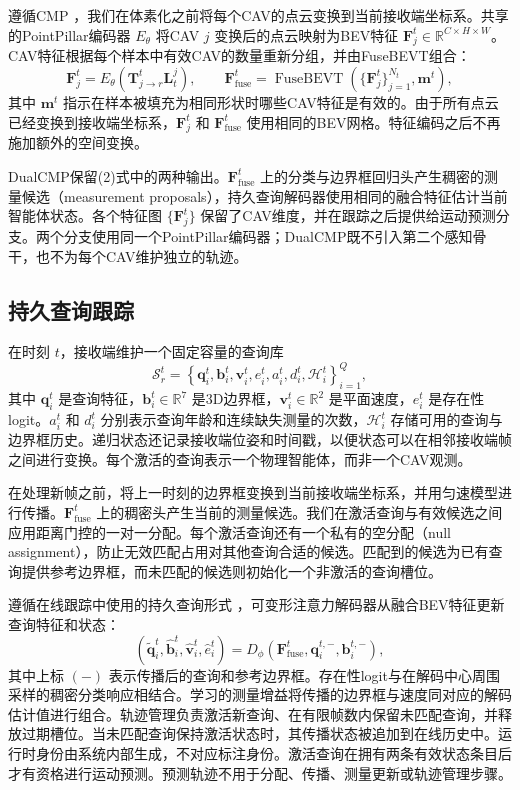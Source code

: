 \documentclass[lettersize,journal]{IEEEtran}
\begin{document}
遵循CMP \cite{wang2025cmp}，我们在体素化之前将每个CAV的点云变换到当前接收端坐标系。共享的PointPillar编码器 \(E_\theta\) 将CAV \(j\) 变换后的点云映射为BEV特征 \(\mathbf{F}_j^t\in\mathbb{R}^{C\times H\times W}\)。CAV特征根据每个样本中有效CAV的数量重新分组，并由FuseBEVT组合：
\[
\mathbf{F}_j^t=E_\theta
\left(\mathbf{T}_{j\rightarrow r}^t\mathbf{L}_t^j\right),
\qquad
\mathbf{F}_{\mathrm{fuse}}^t=
\operatorname{FuseBEVT}
\left(\{\mathbf{F}_j^t\}_{j=1}^{N_t},\mathbf{m}^t\right),
\tag{2}
\]
其中 \(\mathbf{m}^t\) 指示在样本被填充为相同形状时哪些CAV特征是有效的。由于所有点云已经变换到接收端坐标系，\(\mathbf{F}_j^t\) 和 \(\mathbf{F}_{\mathrm{fuse}}^t\) 使用相同的BEV网格。特征编码之后不再施加额外的空间变换。

DualCMP保留(2)式中的两种输出。\(\mathbf{F}_{\mathrm{fuse}}^t\) 上的分类与边界框回归头产生稠密的测量候选（measurement proposals），持久查询解码器使用相同的融合特征估计当前智能体状态。各个特征图 \(\{\mathbf{F}_j^t\}\) 保留了CAV维度，并在跟踪之后提供给运动预测分支。两个分支使用同一个PointPillar编码器；DualCMP既不引入第二个感知骨干，也不为每个CAV维护独立的轨迹。

\subsection{持久查询跟踪}

在时刻 \(t\)，接收端维护一个固定容量的查询库
\[
\mathcal{S}_r^t=
\left\{
\mathbf{q}_i^t,\mathbf{b}_i^t,\mathbf{v}_i^t,
e_i^t,a_i^t,d_i^t,\mathcal{H}_i^t
\right\}_{i=1}^{Q},
\tag{3}
\]
其中 \(\mathbf{q}_i^t\) 是查询特征，\(\mathbf{b}_i^t\in\mathbb{R}^{7}\) 是3D边界框，\(\mathbf{v}_i^t\in\mathbb{R}^{2}\) 是平面速度，\(e_i^t\) 是存在性logit。\(a_i^t\) 和 \(d_i^t\) 分别表示查询年龄和连续缺失测量的次数，\(\mathcal{H}_i^t\) 存储可用的查询与边界框历史。递归状态还记录接收端位姿和时间戳，以便状态可以在相邻接收端帧之间进行变换。每个激活的查询表示一个物理智能体，而非一个CAV观测。

在处理新帧之前，将上一时刻的边界框变换到当前接收端坐标系，并用匀速模型进行传播。\(\mathbf{F}_{\mathrm{fuse}}^t\) 上的稠密头产生当前的测量候选。我们在激活查询与有效候选之间应用距离门控的一对一分配。每个激活查询还有一个私有的空分配（null assignment），防止无效匹配占用对其他查询合适的候选。匹配到的候选为已有查询提供参考边界框，而未匹配的候选则初始化一个非激活的查询槽位。

遵循在线跟踪中使用的持久查询形式 \cite{gu2023vip3d}，可变形注意力解码器从融合BEV特征更新查询特征和状态：
\[
(\widetilde{\mathbf{q}}_i^t,
\widehat{\mathbf{b}}_i^t,
\widehat{\mathbf{v}}_i^t,
\widehat e_i^t)
=D_\phi
\left(
\mathbf{F}_{\mathrm{fuse}}^t,
\mathbf{q}_i^{t,-},
\mathbf{b}_i^{t,-}
\right),
\tag{4}
\]
其中上标 \((- )\) 表示传播后的查询和参考边界框。存在性logit与在解码中心周围采样的稠密分类响应相结合。学习的测量增益将传播的边界框与速度同对应的解码估计值进行组合。轨迹管理负责激活新查询、在有限帧数内保留未匹配查询，并释放过期槽位。当未匹配查询保持激活状态时，其传播状态被追加到在线历史中。运行时身份由系统内部生成，不对应标注身份。激活查询在拥有两条有效状态条目后才有资格进行运动预测。预测轨迹不用于分配、传播、测量更新或轨迹管理步骤。
\end{document}
